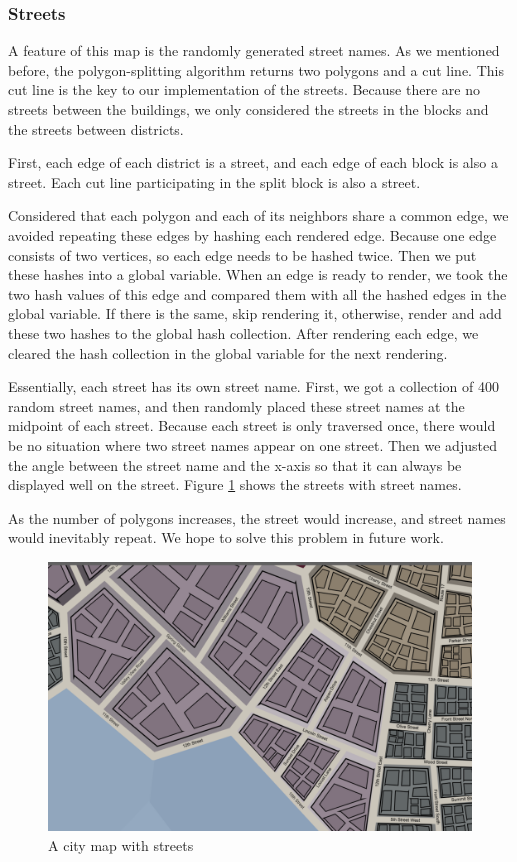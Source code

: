 \subsubsection{Streets}
A feature of this map is the randomly generated street names. As we mentioned before, the polygon-splitting algorithm returns two polygons and a cut line. This cut line is the key to our implementation of the streets. Because there are no streets between the buildings, we only considered the streets in the blocks and the streets between districts.

First, each edge of each district is a street, and each edge of each block is also a street. Each cut line participating in the split block is also a street.

Considered that each polygon and each of its neighbors share a common edge, we avoided repeating these edges by hashing each rendered edge. Because one edge consists of two vertices, so each edge needs to be hashed twice. Then we put these hashes into a global variable. When an edge is ready to render, we took the two hash values of this edge and compared them with all the hashed edges in the global variable. If there is the same, skip rendering it, otherwise, render and add these two hashes to the global hash collection. After rendering each edge, we cleared the hash collection in the global variable for the next rendering.

Essentially, each street has its own street name. First, we got a collection of 400 random street names, and then randomly placed these street names at the midpoint of each street. Because each street is only traversed once, there would be no situation where two street names appear on one street. Then we adjusted the angle between the street name and the x-axis so that it can always be displayed well on the street. Figure \ref{fig:streets} shows the streets with street names.

As the number of polygons increases, the street would increase, and street names would inevitably repeat. We hope to solve this problem in future work.

\begin{figure}[htbp]
  \includegraphics[width=\textwidth]{section04/assets/Map-streets.png}
  \caption{A city map with streets}
  \label{fig:streets}
\end{figure}
